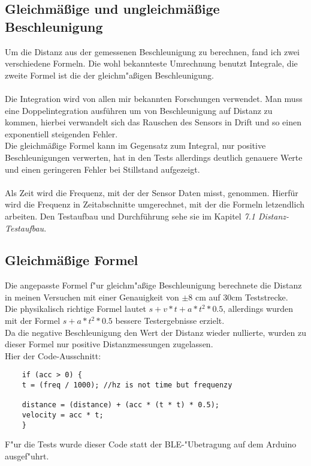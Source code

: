 \subsection{Gleichmäßige und ungleichmäßige Beschleunigung}
Um die Distanz aus der gemessenen Beschleunigung zu berechnen,
fand ich zwei verschiedene Formeln. Die wohl bekannteste Umrechnung 
benutzt Integrale, die zweite Formel ist die der gleichm"aßigen 
Beschleunigung.\\
\\
Die Integration wird von allen mir bekannten Forschungen verwendet. 
Man muss eine Doppelintegration
ausführen um von Beschleunigung auf Distanz zu kommen, hierbei verwandelt 
sich das Rauschen des Sensors in Drift und so einen exponentiell steigenden
Fehler. \\ 
Die gleichmäßige Formel kann im Gegensatz zum Integral, nur positive 
Beschleunigungen verwerten, hat in den Tests allerdings 
deutlich genauere Werte und einen geringeren Fehler bei Stillstand 
aufgezeigt. \\
\\
Als Zeit wird die Frequenz, mit der der Sensor Daten misst, 
genommen. Hierfür wird die Frequenz in Zeitabschnitte umgerechnet, mit 
der die Formeln letzendlich arbeiten. Den Testaufbau und Durchführung 
sehe sie im Kapitel \textit{ 7.1 Distanz-Testaufbau}.

\subsection{Gleichmäßige Formel}
Die angepasste Formel f"ur gleichm"aßige Beschleunigung berechnete
die Distanz in meinen Versuchen mit einer Genauigkeit von
$\pm8$ cm auf 30cm Teststrecke.\\
Die physikalisch richtige Formel lautet 
$s + v * t  + a * t^2 * 0.5$,
allerdings wurden mit der Formel $s + a * t^2 * 0.5$ 
bessere Testergebnisse erzielt.\\
Da die negative Beschleunigung den Wert der Distanz wieder nullierte,
wurden zu dieser Formel nur positive Distanzmessungen zugelassen.\\
Hier der Code-Ausschnitt:
\begin{verbatim}
    if (acc > 0) {
    t = (freq / 1000); //hz is not time but frequenzy

    distance = (distance) + (acc * (t * t) * 0.5);
    velocity = acc * t;
    }
\end{verbatim}
F"ur die Tests wurde dieser Code statt der BLE-"Ubetragung auf dem Arduino ausgef"uhrt. 

